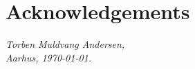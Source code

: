 \chapter{Acknowledgements}

\vspace{2ex}
\begin{flushright}
  \emph{Torben Muldvang Andersen,}\\
  \emph{Aarhus, \today.}
\end{flushright}

\cleardoublepage{}

